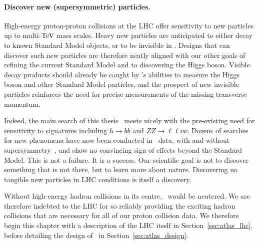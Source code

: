 \paragraph{Discover new (supersymmetric) particles.}
High-energy proton-proton collisions at the LHC offer sensitivity
to new particles up to multi-$\eV[T]$ mass scales.
Heavy new particles are anticipated to either decay to known Standard Model
objects, or to be invisible in \atlas.
Designs that can discover such new particles are therefore neatly aligned with
our other goals of refining the current Standard Model
and to discovering the Higgs boson.
Visible decay products should already be caught by \atlas's abilities
to measure the Higgs boson and other Standard Model particles,
and the prospect of new invisible particles reinforces the need for precise
measurements of the missing transverse momentum.

Indeed, the main search of this thesis~\cite{atlas2022searches}
meets nicely with the pre-existing need for sensitivity to signatures
including
$h \to b\bar b$
and
$ZZ \to \ell\ell\nu\nu$.
Dozens of searches for new phenomena have now been conducted in \atlas\ data,
with and without supersymmetry~\cite{
ATL-PHYS-PUB-2022-013,
ATL-PHYS-PUB-2022-007,
ATL-PHYS-PUB-2022-012,
ATL-PHYS-PUB-2022-036,
ATL-PHYS-PUB-2022-034
},
and show no convincing sign of effects beyond the Standard Model.
This is not a failure. It is a success.
Our scientific goal is not to discover something that is not there,
but to learn more about nature.
Discovering no tangible new particles in LHC conditions is itself a discovery.

Without high-energy hadron collisions in its centre, \atlas\ would be neutered.
We are therefore indebted to the LHC for so reliably providing the exciting
hadron collisions that are necessary for all of our proton collision data.
We therefore begin this chapter with a description of the LHC itself in
Section~\ref{sec:atlas_lhc}, before detailing the design of \atlas\ in
Section~\ref{sec:atlas_design}.

